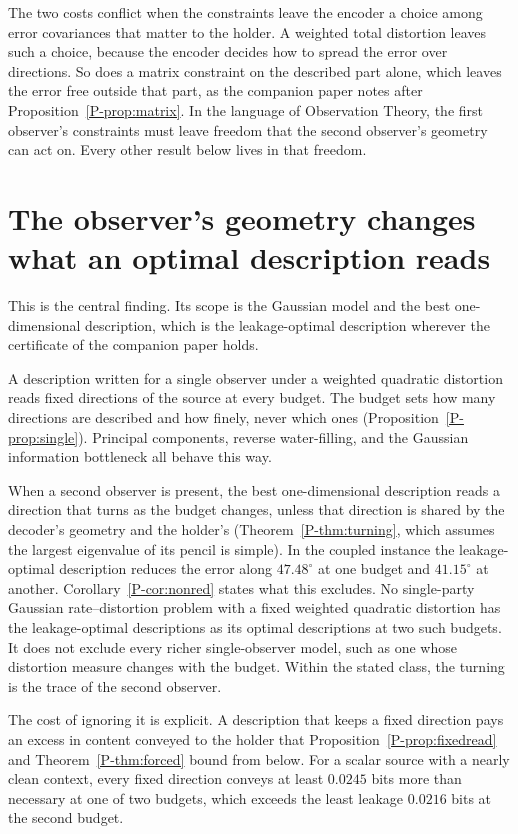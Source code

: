 \documentclass[11pt]{article}
\newcommand{\Th}[1]{Theorem~\ref{P-#1}}
\newcommand{\Pp}[1]{Proposition~\ref{P-#1}}
\newcommand{\Co}[1]{Corollary~\ref{P-#1}}
\begin{document}
The two costs conflict when the constraints leave the encoder a choice
among error covariances that matter to the holder. A weighted total
distortion leaves such a choice, because the encoder decides how to
spread the error over directions. So does a matrix constraint on the
described part alone, which leaves the error free outside that part, as
the companion paper notes after \Pp{prop:matrix}. In the language of
Observation Theory, the first observer's constraints must leave freedom
that the second observer's geometry can act on. Every other result below
lives in that freedom.

\section{The observer's geometry changes what an optimal description reads}
\label{sec:geometry}

This is the central finding. Its scope is the Gaussian model and the
best one-dimensional description, which is the leakage-optimal
description wherever the certificate of the companion paper holds.

A description written for a single observer under a weighted quadratic
distortion reads fixed directions of the source at every budget. The
budget sets how many directions are described and how finely, never
which ones (\Pp{prop:single}). Principal components, reverse
water-filling, and the Gaussian information bottleneck all behave this
way.

When a second observer is present, the best one-dimensional description
reads a direction that turns as the budget changes, unless that
direction is shared by the decoder's geometry and the holder's
(\Th{thm:turning}, which assumes the largest eigenvalue of its pencil is
simple). In the coupled instance the leakage-optimal description reduces
the error along $47.48^\circ$ at one budget and $41.15^\circ$ at another.
\Co{cor:nonred} states what this excludes. No single-party Gaussian
rate--distortion problem with a fixed weighted quadratic distortion has
the leakage-optimal descriptions as its optimal descriptions at two such
budgets. It does not exclude every richer single-observer model, such as
one whose distortion measure changes with the budget. Within the stated
class, the turning is the trace of the second observer.

The cost of ignoring it is explicit. A description that keeps a fixed
direction pays an excess in content conveyed to the holder that
\Pp{prop:fixedread} and \Th{thm:forced} bound from below. For a scalar
source with a nearly clean context, every fixed direction conveys at
least $0.0245$ bits more than necessary at one of two budgets, which
exceeds the least leakage $0.0216$ bits at the second budget.
\end{document}

